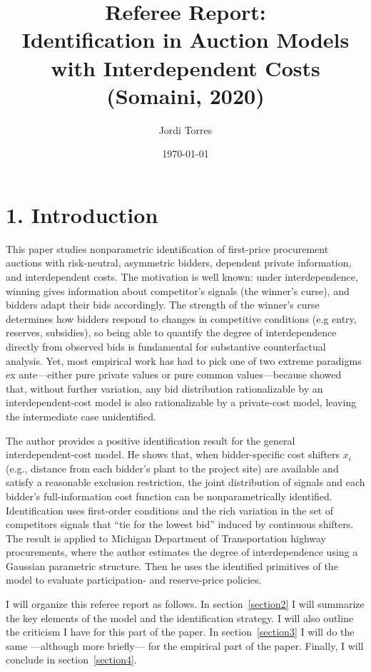 \documentclass{article}
\begin{document}
\title{Referee Report: \\ Identification in Auction Models with Interdependent Costs (Somaini, 2020)}
\author{Jordi Torres}
\date{\today}
\maketitle

\section*{1. Introduction}
This paper studies nonparametric identification of first-price procurement auctions with risk-neutral, asymmetric bidders, dependent private information, and interdependent costs. The motivation is well known: under interdependence, winning gives information about competitor's signals (the winner's curse), and bidders adapt their bids accordingly. The strength of the winner's curse determines how bidders respond to changes in competitive conditions (e.g entry, reserves, subsidies), so being able to quantify the degree of interdependence directly from observed bids is fundamental for substantive counterfactual analysis. Yet, most empirical work has had to pick one of two extreme paradigms ex ante---either pure private values or pure common values---because \citet{LaffontVuong1996} showed that, without further variation, any bid distribution rationalizable by an interdependent-cost model is also rationalizable by a private-cost model, leaving the intermediate case unidentified.

The author provides a positive identification result for the general interdependent-cost model. He shows that, when bidder-specific cost shifters $x_i$ (e.g., distance from each bidder's plant to the project site) are available and satisfy a reasonable exclusion restriction, the joint distribution of signals and each bidder's full-information cost function can be nonparametrically identified. Identification uses first-order conditions and the rich variation in the set of competitors signals that ``tie for the lowest bid'' induced by continuous shifters. The result is applied to Michigan Department of Transportation highway procurements, where the author estimates the degree of interdependence using a Gaussian parametric structure. Then he uses the identified primitives of the model to evaluate participation- and reserve-price policies.

I will organize this referee report as follows. In section~\ref{section2} I will summarize the key elements of the model and the identification strategy. I will also outline the criticism I have for this part of the paper. In section~\ref{section3} I will do the same ---although more briefly--- for the empirical part of the paper. Finally, I will conclude in section~\ref{section4}.
\end{document}
